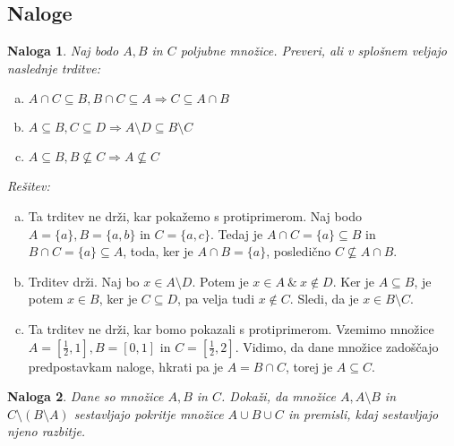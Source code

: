 \documentclass[a4paper, 10pt]{article}
\newtheorem{nal}{Naloga}
\newenvironment{resitev}{\begin{flushleft}\textit{Rešitev:}}{\hfill\end{flushleft}}
\begin{document}
	\subsection{Naloge}
	\begin{nal}
		Naj bodo $A, B$ in $C$ poljubne množice. Preveri, ali v splošnem veljajo naslednje trditve:
		\begin{enumerate}[a)]
			\item $A\cap C \subseteq B, B\cap C \subseteq A \Rightarrow C \subseteq A\cap B$
			\item $A\subseteq B, C \subseteq D \Rightarrow A\setminus D \subseteq B \setminus C$
			\item $A\subseteq B, B\nsubseteq C \Rightarrow A \nsubseteq C$
		\end{enumerate}
	\end{nal}
	\begin{resitev}
		\begin{enumerate}[a)]
			\item Ta trditev ne drži, kar pokažemo s protiprimerom. Naj bodo $A = \{a\}, B= \{a, b\}$ in $C=\{a, c\}$. Tedaj je $A\cap C = \{a\} \subseteq B$ in $B\cap C = \{a\}\subseteq A$, toda, ker je $A\cap B = \{a\}$, posledično $C\nsubseteq A\cap B$.
			\item Trditev drži. Naj bo $x\in A\setminus D$. Potem je $x\in A ~\&~ x\notin D$. Ker je $A\subseteq B$, je potem $x\in B$, ker je $C\subseteq D$, pa velja tudi $x\notin C$. Sledi, da je $x\in B\setminus C$.
			\item Ta trditev ne drži, kar bomo pokazali s protiprimerom. Vzemimo množice $A = [\frac{1}{2}, 1], B = [0, 1]$ in $C = [\frac{1}{2}, 2]$. Vidimo, da dane množice zadoščajo predpostavkam naloge, hkrati pa je $A = B\cap C$, torej je $A\subseteq C$.
		\end{enumerate}
	\end{resitev}
	\begin{nal}
		Dane so množice $A, B$ in $C$. Dokaži, da množice $A, A\setminus B$ in $C\setminus(B\setminus A)$ sestavljajo pokritje množice $A\cup B\cup C$ in premisli, kdaj sestavljajo njeno razbitje.
	\end{nal}
\end{document}
